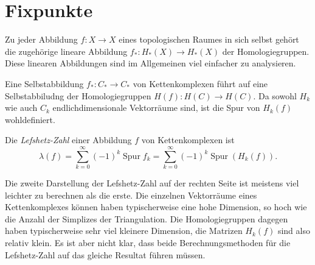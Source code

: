 %
%
%
\section{Fixpunkte
\label{buch:section:fixpunkte}}
Zu jeder Abbildung $f\colon X\to X$ eines topologischen Raumes in sich
selbst gehört die zugehörige lineare Abbildung $f_*\colon H_*(X)\to H_*(X)$
der Homologiegruppen.
Diese linearen Abbildungen sind im Allgemeinen viel einfacher zu
analysieren.

%


Eine Selbstabbildung $f_*\colon C_*\to C_*$ von Kettenkomplexen führt auf
eine Selbstabbiludng der Homologiegruppen $H(f)\colon H(C)\to H(C)$.
Da sowohl $H_k$ wie auch $C_k$ endlichdimensionale Vektorräume sind, 
ist die Spur von $H_k(f)$ wohldefiniert.

\begin{definition}
Die {\em Lefshetz-Zahl} einer Abbildung $f$ von Kettenkomplexen ist
\begin{equation}
\lambda(f)
=
\sum_{k=0}^\infty
(-1)^k \operatorname{Spur}f_k
=
\sum_{k=0}^\infty 
(-1)^k \operatorname{Spur}(H_k(f)).
\label{buch:homologie:lefschetz-zahl}
\end{equation}
\end{definition}

Die zweite Darstellung  der Lefshetz-Zahl auf der rechten Seite ist
meistens viel leichter zu berechnen als die erste.
Die einzelnen Vektorräume eines Kettenkomplexes können haben typischerweise
eine hohe Dimension, so hoch wie die Anzahl der Simplizes der Triangulation.
Die Homologiegruppen dagegen haben typischerweise sehr viel kleinere 
Dimension, die Matrizen $H_k(f)$ sind also relativ klein.
Es ist aber nicht klar, dass beide Berechnungsmethoden für die 
Lefshetz-Zahl auf das gleiche Resultat führen müssen.

